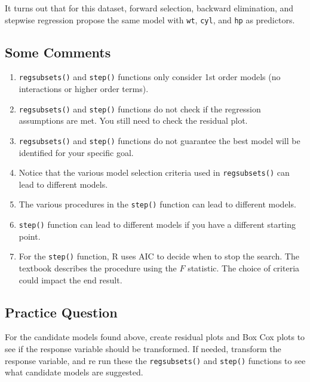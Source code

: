 \documentclass[
]{book}
\providecommand{\tightlist}{%
  \setlength{\itemsep}{0pt}\setlength{\parskip}{0pt}}
\begin{document}
It turns out that for this dataset, forward selection, backward elimination, and stepwise regression propose the same model with \texttt{wt}, \texttt{cyl}, and \texttt{hp} as predictors.

\hypertarget{some-comments}{%
\subsection*{Some Comments}\label{some-comments}}

\begin{enumerate}
\def\labelenumi{\arabic{enumi}.}
\tightlist
\item
  \texttt{regsubsets()} and \texttt{step()} functions only consider 1st order models (no interactions or higher order terms).
\item
  \texttt{regsubsets()} and \texttt{step()} functions do not check if the regression assumptions are met. You still need to check the residual plot.
\item
  \texttt{regsubsets()} and \texttt{step()} functions do not guarantee the best model will be identified for your specific goal.
\item
  Notice that the various model selection criteria used in \texttt{regsubsets()} can lead to different models.
\item
  The various procedures in the \texttt{step()} function can lead to different models.
\item
  \texttt{step()} function can lead to different models if you have a different starting point.
\item
  For the \texttt{step()} function, R uses AIC to decide when to stop the search. The textbook describes the procedure using the \(F\) statistic. The choice of criteria could impact the end result.
\end{enumerate}

\hypertarget{practice-question-2}{%
\subsection*{Practice Question}\label{practice-question-2}}

For the candidate models found above, create residual plots and Box Cox plots to see if the response variable should be transformed. If needed, transform the response variable, and re run these the \texttt{regsubsets()} and \texttt{step()} functions to see what candidate models are suggested.
\end{document}
